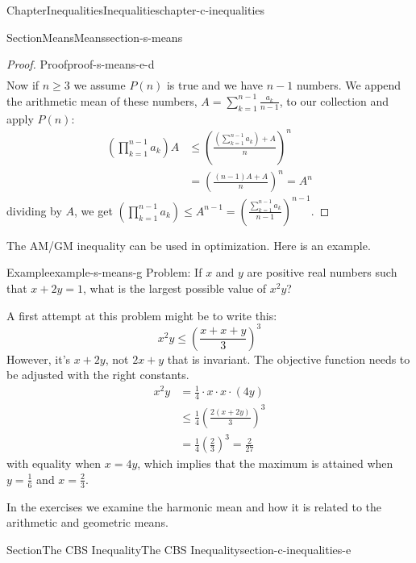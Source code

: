 \documentclass[oneside,10pt,]{book}
\numberwithin{equation}{section}
\begin{document}
\begin{chapterptx}{Chapter}{Inequalities}{}{Inequalities}{}{}{chapter-c-inequalities}
\begin{sectionptx}{Section}{Means}{}{Means}{}{}{section-s-means}
\begin{proof}{Proof}{}{proof-s-means-e-d}
\begin{equation*}
\begin{split}
\end{split}
\end{equation*}
Now if \(n \ge 3\) we assume \(P(n)\) is true and we have \(n-1\) numbers. We append the arithmetic mean of these numbers, \(A = \sum_{k=1}^{n-1} \frac{a_k}{n-1}\), to our collection and apply \(P(n)\):%
\begin{equation*}
\begin{split}
\left(\prod_{k=1}^{n-1} a_k\right)A & \leq \left(\frac{\left(\sum_{k=1}^{n-1} a_k\right) + A}{n}\right)^n\\
& = \left( \frac{(n-1)A + A}{n} \right)^n = A^n
\end{split}
\end{equation*}
dividing by \(A\), we get \(\left(\prod_{k=1}^{n-1} a_k\right) \leq A^{n-1} = \left(\frac{\sum_{k=1}^{n-1} a_{k}}{n-1}\right)^{n-1}\).%
\end{proof}
The AM\slash{}GM inequality can be used in optimization.  Here is an example.%
\begin{example}{Example}{}{example-s-means-g}%
Problem:  If \(x\) and \(y\) are positive real numbers such that \(x+2y=1\), what is the largest possible value of \(x^2 y\)?%
\par
A first attempt at this problem might be to write this:%
\begin{equation*}
x^2 y \leq  \left( \frac{x + x + y}{3} \right)^3
\end{equation*}
However, it's \(x+2y\), not \(2x + y\) that is invariant. The objective function needs to be adjusted with the right constants.%
\begin{equation*}
\begin{split}
x^2 y &= \frac{1}{4} \cdot x\cdot x\cdot (4 y) \\
&\leq  \frac{1}{4} \left( \frac{2(x+2y)}{3} \right)^3\\
& = \frac{1}{4} \left( \frac{2}{3} \right)^3 = \frac{2}{27} 
\end{split}
\end{equation*}
with equality when \(x=4y\), which implies that the maximum is attained when \(y=\frac{1}{6}\) and \(x=\frac{2}{3}\).%
\end{example}
In the exercises we examine the harmonic mean and how it is related to the arithmetic and geometric means.%
\end{sectionptx}
%
%
\typeout{************************************************}
\typeout{************************************************}
%
\begin{sectionptx}{Section}{The CBS Inequality}{}{The CBS Inequality}{}{}{section-c-inequalities-e}

\end{sectionptx}
\end{chapterptx}
\end{document}
